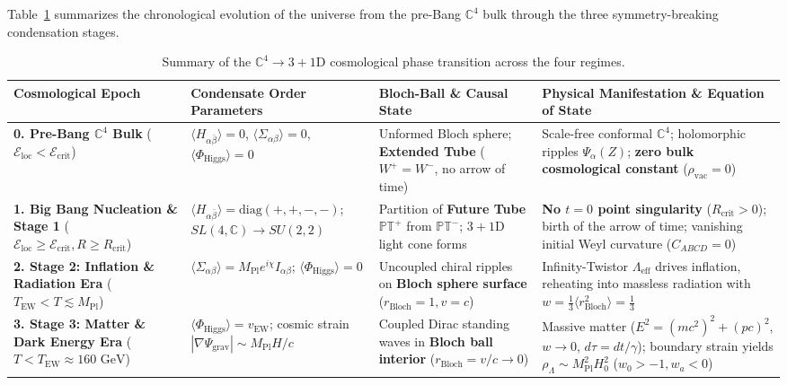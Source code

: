 \documentclass[11pt,a4paper]{article}
\begin{document}
Table~\ref{tab:cosmo_synthesis} summarizes the chronological evolution of the universe from the pre-Bang $\mathbb{C}^4$ bulk through the three symmetry-breaking condensation stages.

\begin{table}[H]
\centering
\small
\renewcommand{\arraystretch}{1.35}
\begin{tabularx}{\textwidth}{>{\raggedright\arraybackslash}p{} >{\raggedright\arraybackslash}p{} >{\raggedright\arraybackslash}p{} >{\raggedright\arraybackslash}X}
\toprule
\textbf{Cosmological Epoch} & \textbf{Condensate Order Parameters} & \textbf{Bloch-Ball \& Causal State} & \textbf{Physical Manifestation \& Equation of State} \\
\midrule
\textbf{0. Pre-Bang $\mathbb{C}^4$ Bulk} ($\mathcal{E}_{\text{loc}} < \mathcal{E}_{\text{crit}}$) & $\langle H_{\alpha\bar{\beta}}\rangle = 0$, $\langle\Sigma_{\alpha\beta}\rangle = 0$, $\langle\Phi_{\text{Higgs}}\rangle = 0$ & Unformed Bloch sphere; \textbf{Extended Tube} ($W^+ = W^-$, no arrow of time) & Scale-free conformal $\mathbb{C}^4$; holomorphic ripples $\Psi_\alpha(Z)$; \textbf{zero bulk cosmological constant} ($\rho_{\text{vac}} = 0$) \\
\addlinespace
\textbf{1. Big Bang Nucleation \& Stage 1} ($\mathcal{E}_{\text{loc}} \ge \mathcal{E}_{\text{crit}}, R \ge R_{\text{crit}}$) & $\langle H_{\alpha\bar{\beta}}\rangle = \text{diag}(+,+,-,-)$; $SL(4,\mathbb{C}) \to SU(2,2)$ & Partition of \textbf{Future Tube $\mathbb{PT}^+$} from $\mathbb{PT}^-$; $3+1\text{D}$ light cone forms & \textbf{No $t=0$ point singularity} ($R_{\text{crit}} > 0$); birth of the arrow of time; vanishing initial Weyl curvature ($C_{ABCD} = 0$) \\
\addlinespace
\textbf{2. Stage 2: Inflation \& Radiation Era} ($T_{\text{EW}} < T \lesssim M_{\text{Pl}}$) & $\langle\Sigma_{\alpha\beta}\rangle = M_{\text{Pl}}e^{i\chi}I_{\alpha\beta}$; $\langle\Phi_{\text{Higgs}}\rangle = 0$ & Uncoupled chiral ripples on \textbf{Bloch sphere surface} ($r_{\text{Bloch}} = 1, v = c$) & Infinity-Twistor $\Lambda_{\text{eff}}$ drives inflation, reheating into massless radiation with $w = \frac{1}{3}\langle r_{\text{Bloch}}^2\rangle = \frac{1}{3}$ \\
\addlinespace
\textbf{3. Stage 3: Matter \& Dark Energy Era} ($T < T_{\text{EW}} \approx 160\text{ GeV}$) & $\langle\Phi_{\text{Higgs}}\rangle = v_{\text{EW}}$; cosmic strain $|\nabla\Psi_{\text{grav}}| \sim M_{\text{Pl}}H/c$ & Coupled Dirac standing waves in \textbf{Bloch ball interior} ($r_{\text{Bloch}} = v/c \to 0$) & Massive matter ($E^2 = (mc^2)^2 + (pc)^2$, $w \to 0$, $d\tau = dt/\gamma$); boundary strain yields $\rho_\Lambda \sim M_{\text{Pl}}^2 H_0^2$ ($w_0 > -1, w_a < 0$) \\
\bottomrule
\end{tabularx}
\caption{Summary of the $\mathbb{C}^4 \to 3+1\text{D}$ cosmological phase transition across the four regimes.}
\label{tab:cosmo_synthesis}
\end{table}
\end{document}
